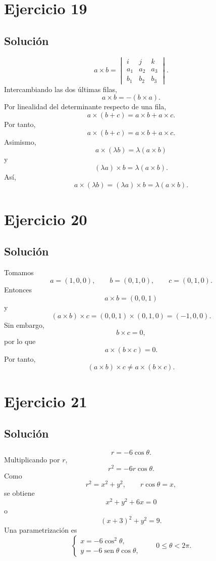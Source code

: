 \documentclass[11pt,a4paper]{article}
\newcommand{\sen}{\operatorname{sen}}
\begin{document}
\section{Ejercicio 19}
\subsection{Solución}
\[
a\times b
=
\begin{vmatrix}
i&j&k\\
a_1&a_2&a_3\\
b_1&b_2&b_3
\end{vmatrix}.
\]
Intercambiando las dos últimas filas,
\[
\boxed{a\times b=-(b\times a)}.
\]
Por linealidad del determinante respecto de una fila,
\[
a\times(b+c)
=
a\times b+a\times c.
\]
Por tanto,
\[
\boxed{
a\times(b+c)=a\times b+a\times c.
}
\]
Asimismo,
\[
a\times(\lambda b)=\lambda(a\times b)
\]
y
\[
(\lambda a)\times b=\lambda(a\times b).
\]
Así,
\[
\boxed{
a\times(\lambda b)
=
(\lambda a)\times b
=
\lambda(a\times b).
}
\]

\section{Ejercicio 20}
\subsection{Solución}
Tomamos
\[
a=(1,0,0),
\qquad
b=(0,1,0),
\qquad
c=(0,1,0).
\]
Entonces
\[
a\times b=(0,0,1)
\]
y
\[
(a\times b)\times c
=
(0,0,1)\times(0,1,0)
=
(-1,0,0).
\]
Sin embargo,
\[
b\times c=0,
\]
por lo que
\[
a\times(b\times c)=0.
\]
Por tanto,
\[
\boxed{
(a\times b)\times c
\neq
a\times(b\times c).
}
\]

\section{Ejercicio 21}
\subsection{Solución}
\[
r=-6\cos\theta.
\]
Multiplicando por \(r\),
\[
r^2=-6r\cos\theta.
\]
Como
\[
r^2=x^2+y^2,
\qquad
r\cos\theta=x,
\]
se obtiene
\[
\boxed{x^2+y^2+6x=0}
\]
o
\[
\boxed{(x+3)^2+y^2=9}.
\]
Una parametrización es
\[
\boxed{
\begin{cases}
x=-6\cos^2\theta,\\
y=-6\sen\theta\cos\theta,
\end{cases}
\qquad
0\leq\theta<2\pi.
}
\]
\end{document}
